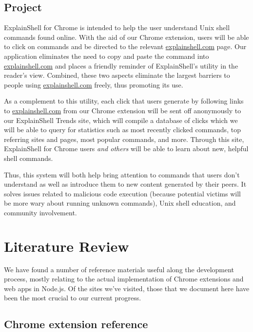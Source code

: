 \documentclass[11pt]{article}
\begin{document}
\subsection{Project}

ExplainShell for Chrome is intended to help the user understand Unix shell
commands found online. With the aid of our Chrome extension, users will be able
to click on commands and be directed to the relevant \url{explainshell.com} page.
Our application eliminates the need to copy and paste the command into
\url{explainshell.com} and places a friendly reminder of ExplainShell's utility
in the reader's view. Combined, these two aspects eliminate the largest
barriers to people using \url{explainshell.com} freely, thus promoting its use.

As a complement to this utility, each click that users generate by following
links to \url{explainshell.com} from our Chrome extension will be sent off
anonymously to our ExplainShell Trends site, which will compile a database of
clicks which we will be able to query for statistics such as most recently
clicked commands, top referring sites and pages, most popular commands, and
more. Through this site, ExplainShell for Chrome users \textit{and others} will
be able to learn about new, helpful shell commands.

Thus, this system will both help bring attention to commands that users don't
understand as well as introduce them to new content generated by their peers.
It solves issues related to malicious code execution (because potential victims
will be more wary about running unknown commands), Unix shell education, and
community involvement.

\section{Literature Review}

We have found a number of reference materials useful along the development
process, mostly relating to the actual implementation of Chrome extensions and
web apps in Node.js. Of the sites we've visited, those that we document here
have been the most crucial to our current progress.

\subsection{Chrome extension reference}
\end{document}
